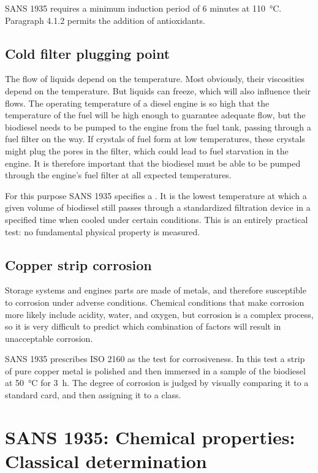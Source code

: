 SANS 1935 requires a minimum induction period of 6 minutes at
\SI{110}{\celsius}. Paragraph 4.1.2 permits the addition of antioxidants.

\subsection{Cold filter plugging point}

The flow of liquids depend on the temperature. Most obviously, their viscosities
depend on the temperature. But liquids can freeze, which will also influence
their flows. The operating temperature of a diesel engine is so high that the
temperature of the fuel will be high enough to guarantee adequate flow, but the
biodiesel needs to be pumped to the engine from the fuel tank, passing through a
fuel filter on the way. If crystals of fuel form at low temperatures, these
crystals might plug the pores in the filter, which could lead to fuel starvation
in the engine. It is therefore important that the biodiesel must be able to be
pumped through the engine's fuel filter at all expected temperatures.

For this purpose SANS 1935 specifies a . It
is the lowest temperature at which a given volume of biodiesel still passes
through a standardized filtration device in a specified time when cooled under
certain conditions. This is an entirely practical test: no fundamental
physical property is measured.

\subsection{Copper strip corrosion}

Storage systems and engines parts are made of metals, and therefore susceptible
to corrosion under adverse conditions. Chemical conditions that make corrosion
more likely include acidity, water, and oxygen, but corrosion is a complex
process, so it is very difficult to predict which combination of factors will
result in unacceptable corrosion.

SANS 1935 prescribes ISO 2160 as the test for corrosiveness. In this test a
strip of pure copper metal is polished and then immersed in a sample of the
biodiesel at \SI{50}{\celsius} for \SI{3}{\hour}. The degree of corrosion is
judged by visually comparing it to a standard card, and then assigning it to a
class.

\section{SANS 1935: Chemical properties: Classical determination}

